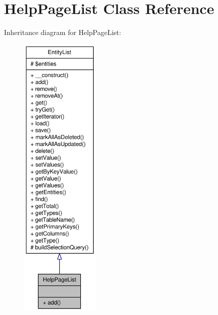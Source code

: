 \hypertarget{classHelpPageList}{
\section{HelpPageList Class Reference}
\label{classHelpPageList}
}


Inheritance diagram for HelpPageList:\nopagebreak
\begin{figure}[H]
\begin{center}
\leavevmode
\includegraphics[height=400pt]{classHelpPageList__inherit__graph}
\end{center}
\end{figure}


